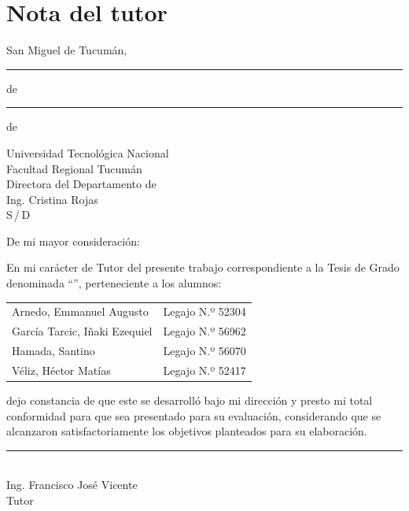 
\chapter*{Nota del tutor}
\begin{flushright}
San Miguel de Tucumán, \rule{1.2cm}{0.4pt} de \rule{2.8cm}{0.4pt} de \anioProyecto
\end{flushright}

\noindent Universidad Tecnológica Nacional\\
Facultad Regional Tucumán\\
Directora del Departamento de \carreraProyecto\\
Ing. Cristina Rojas\\
S\,/\,D

\bigskip
\noindent De mi mayor consideración:

\medskip
En mi carácter de Tutor del presente trabajo correspondiente a la Tesis de Grado denominada ``\tituloProyecto'', perteneciente a los alumnos:

\begin{center}
\begin{tabular}{@{}ll@{}}
    Arnedo, Emmanuel Augusto & Legajo N.º 52304 \\
    García Tarcic, Iñaki Ezequiel & Legajo N.º 56962 \\
    Hamada, Santino & Legajo N.º 56070 \\
    Véliz, Héctor Matías & Legajo N.º 52417 \\
\end{tabular}
\end{center}

\noindent dejo constancia de que este se desarrolló bajo mi dirección y presto mi total conformidad para que sea presentado para su evaluación, considerando que se alcanzaron satisfactoriamente los objetivos planteados para su elaboración.

\vspace{2.5cm}
\begin{center}
\rule{7cm}{0.4pt}\\
Ing. Francisco José Vicente\\
Tutor
\end{center}

